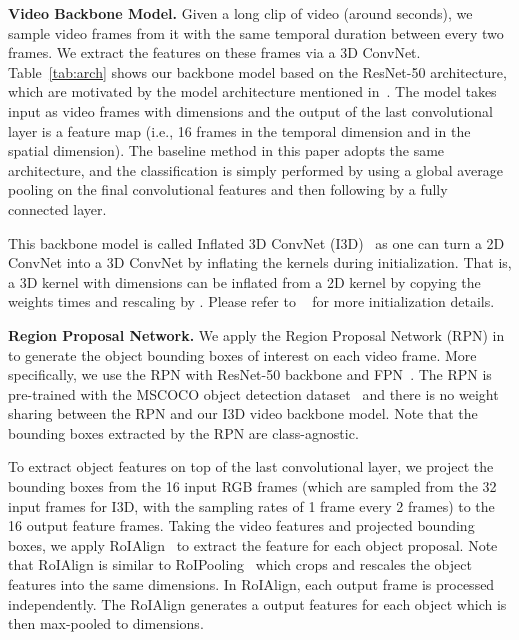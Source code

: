 \documentclass[runningheads]{llncs}
\begin{document}
\textbf{Video Backbone Model.} Given a long clip of video (around  seconds), we sample  video frames from it with the same temporal duration between every two frames. We extract the features on these frames via a 3D ConvNet. Table~\ref{tab:arch} shows our backbone model based on the ResNet-50 architecture, which are motivated by the model architecture mentioned in~\cite{xiaolongwang2017nonlocal}. The model takes input as  video frames with  dimensions and the output of the last convolutional layer is a  feature map (i.e., 16 frames in the temporal dimension and  in the  spatial dimension). The baseline method in this paper adopts the same architecture, and the classification is simply performed by using a global average pooling on the final convolutional features and then following by a fully connected layer. 

This backbone model is called Inflated 3D ConvNet (I3D)~\cite{Feichtenhofer2016,Carreira2017,xiaolongwang2017nonlocal} as one can turn a 2D ConvNet into a 3D ConvNet by inflating the kernels during initialization. That is, a 3D kernel with  dimensions can be inflated from a 2D  kernel by copying the weights  times and rescaling by . Please refer to ~\cite{Feichtenhofer2016,Carreira2017,xiaolongwang2017nonlocal} for more initialization details.


\textbf{Region Proposal Network.} We apply the Region Proposal Network (RPN) in~\cite{Ren2015,Detectron2018} to generate the object bounding boxes of interest on each video frame. More specifically, we use the RPN with ResNet-50 backbone and FPN~\cite{Lin2017}. The RPN is pre-trained with the MSCOCO object detection dataset~\cite{Lin2014} and there is no weight sharing between the RPN and our I3D video backbone model. Note that the bounding boxes extracted by the RPN are class-agnostic. 


To extract object features on top of the last convolutional layer, we project the bounding boxes from the 16 input RGB frames (which are sampled from the 32 input frames for I3D, with the sampling rates of 1 frame every 2 frames) to the 16 output feature frames. Taking the video features and projected bounding boxes, we apply RoIAlign~\cite{He2017} to extract the feature for each object proposal. Note that RoIAlign is similar to  RoIPooling~\cite{Girshick2015} which crops and rescales the object features into the same dimensions.  In RoIAlign, each output frame is processed independently.  The RoIAlign generates a  output features for each object which is then max-pooled to  dimensions.  
\end{document}
